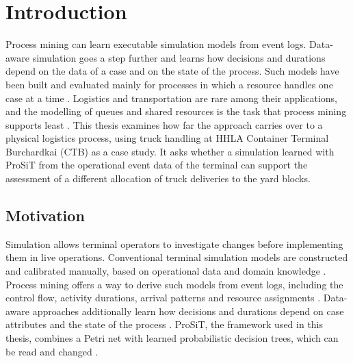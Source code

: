 \chapter{Introduction}
\label{chp:introduction}

Process mining can learn executable simulation models from event logs. Data-aware
simulation goes a step further and learns how decisions and durations depend on
the data of a case and on the state of the process. Such models have been built
and evaluated mainly for processes in which a resource handles one case at a
time \cite{Vinci2026prosit}. Logistics and transportation are rare among their
applications, and the modelling of queues and shared resources is the task that
process mining supports least \cite{Sulis2026SimulationReview}. This thesis examines how far the approach carries over to a
physical logistics process, using truck handling at HHLA Container Terminal
Burchardkai (CTB) as a case study. It asks whether a simulation learned with ProSiT
from the operational event data of the terminal can support the assessment of a
different allocation of truck deliveries to the yard blocks.

\section{Motivation}

Simulation allows terminal operators to investigate changes before implementing
them in live operations. Conventional terminal simulation models are constructed
and calibrated manually, based on operational data and domain knowledge
\cite{CTSteenken2004,OptimizingCTs2023}. Process mining offers a way to derive such
models from event logs, including the control flow, activity durations, arrival
patterns and resource assignments \cite{PMRozinat2009}. Data-aware approaches
additionally learn how decisions and durations depend on case attributes and the
state of the process \cite{mannhardt2023stochasticProcessesModelling,Vinci2023Inf.Activ.Prob}.
ProSiT, the framework used in this thesis, combines a Petri net with learned
probabilistic decision trees, which can be read and changed \cite{Vinci2026prosit}.

